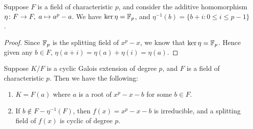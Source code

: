 \begin{proposition}
    Suppose \(F\) is a field of characteristic \(p\),
    and consider the additive homomorphism \(\eta\colon F\to F,\;a\mapsto a^p-a\).
    We have \(\ker\eta = \mathbb{F}_p\), and \(\eta^{-1}(b) = \{b+i : 0 \leq i \leq p-1\}\).
\end{proposition}
\begin{proof}
    Since \(\mathbb{F}_p\) is the splitting field of \(x^p - x\), we know that \(\ker\eta = \mathbb{F}_p\).
    Hence given any \(b \in F\), \(\eta(a+i) = \eta(a)+\eta(i) = \eta(a)\).
\end{proof}
\begin{theorem}
    Suppose \(K/F\) is a cyclic Galois extension of degree \(p\),
    and \(F\) is a field of characteristic \(p\).
    Then we have the following:
    \begin{enumerate}[label={(\alph*)}, itemsep=0mm]
        \item \(K = F(a)\) where \(a\) is a root of \(x^p-x-b\) for some \(b \in F\).
        \item If \(b \notin F - \eta^{-1}(F)\), then \(f(x) = x^p-x-b\) is irreducible,
            and a splitting field of \(f(x)\) is cyclic of degree \(p\).
    \end{enumerate}
\end{theorem}
